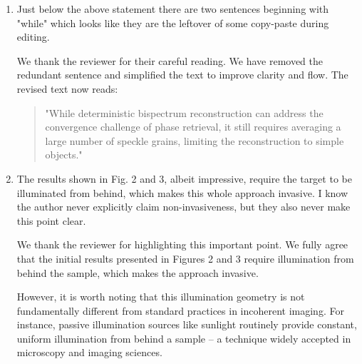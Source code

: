 \documentclass[12pt]{article}
\newcommand{\hlred}[1]{\sethlcolor{red!30}\hl{#1}}
\newenvironment{solved_reviewercomment}
    {\begin{tcolorbox}[width=\linewidth,colback=gray!5,colframe=solved_commentcolor!50,title=Reviewer Comment,left=5pt,right=5pt]}
    {\end{tcolorbox}}
\newenvironment{ourresponse}
    {\begin{tcolorbox}[width=\linewidth,breakable,enhanced,colback=gray!5,colframe=responsecolor!50,title=Response,left=5pt,right=5pt]}
    {\end{tcolorbox}}
\begin{document}
\begin{enumerate}[label=\arabic*.]
\begin{enumerate}[label=3.\alph*.]
\begin{ourresponse}
        \end{ourresponse}
        
        \item \leavevmode\vspace{-\baselineskip}
        \begin{solved_reviewercomment}
            Just below the above statement there are two sentences beginning with "while" which looks like they are the leftover of some copy-paste during editing.
        \end{solved_reviewercomment}
        \begin{ourresponse}
            We thank the reviewer for their careful reading. We have removed the redundant sentence and simplified the text to improve clarity and flow. The revised text now reads:
            \begin{quote}
                "While deterministic bispectrum reconstruction can address the convergence challenge of phase retrieval, it still requires averaging a large number of speckle grains, limiting the reconstruction to simple objects."
            \end{quote}
        \end{ourresponse}
        \item \leavevmode\vspace{-\baselineskip}
        \begin{solved_reviewercomment}
            The results shown in Fig. 2 and 3, albeit impressive, require the target to be illuminated from behind, which makes this whole approach invasive. I know the author never explicitly claim non-invasiveness, but they also never make this point clear.
        \end{solved_reviewercomment}
        \begin{ourresponse}
            We thank the reviewer for highlighting this important point.
            We fully agree that the initial results presented in Figures 2 and 3 require illumination from behind the sample, which makes the approach invasive. 
            
            However, it is worth noting that this illumination geometry is not fundamentally different from standard practices in incoherent imaging. For instance, passive illumination sources like sunlight routinely provide constant, uniform illumination from behind a sample – a technique widely accepted in microscopy and imaging sciences.
            

\end{ourresponse}
\end{enumerate}
\end{enumerate}
\end{document}
